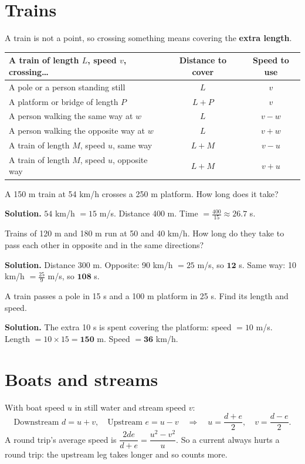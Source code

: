 \documentclass[11pt,a4paper,openany]{report}
\begin{document}
\section{Trains}
A train is not a point, so crossing something means covering the \textbf{extra length}.
\begin{center}\small
\begin{tabular}{lcc}
\toprule
A train of length $L$, speed $v$, crossing\dots & Distance to cover & Speed to use\\\midrule
A pole or a person standing still & $L$ & $v$\\
A platform or bridge of length $P$ & $L+P$ & $v$\\
A person walking the same way at $w$ & $L$ & $v-w$\\
A person walking the opposite way at $w$ & $L$ & $v+w$\\
A train of length $M$, speed $u$, same way & $L+M$ & $v-u$\\
A train of length $M$, speed $u$, opposite way & $L+M$ & $v+u$\\
\bottomrule
\end{tabular}
\end{center}

\begin{example}[platform]
A 150 m train at 54 km/h crosses a 250 m platform. How long does it take?

\textbf{Solution.} $54$ km/h $=15$ m/s. Distance 400 m. Time $=\frac{400}{15}\approx\mathbf{26.7}$ s.
\end{example}

\begin{example}
Trains of 120 m and 180 m run at 50 and 40 km/h. How long do they take to pass each other in opposite and in the same directions?

\textbf{Solution.} Distance 300 m. Opposite: 90 km/h $=25$ m/s, so $\mathbf{12}$ s. Same way: 10 km/h $=\frac{25}9$ m/s, so $\mathbf{108}$ s.
\end{example}

\begin{example}
A train passes a pole in 15 s and a 100 m platform in 25 s. Find its length and speed.

\textbf{Solution.} The extra 10 s is spent covering the platform: speed $=10$ m/s. Length $=10\times15=\mathbf{150}$ m. Speed $=\mathbf{36}$ km/h.
\end{example}

\section{Boats and streams}
With boat speed $u$ in still water and stream speed $v$:
\[\text{Downstream }d=u+v,\quad\text{Upstream }e=u-v\quad\Longrightarrow\quad u=\frac{d+e}2,\quad v=\frac{d-e}2.\]
A round trip's average speed is $\dfrac{2de}{d+e}=\dfrac{u^2-v^2}{u}$. So a current always hurts a round trip: the upstream leg takes longer and so counts more.
\end{document}

